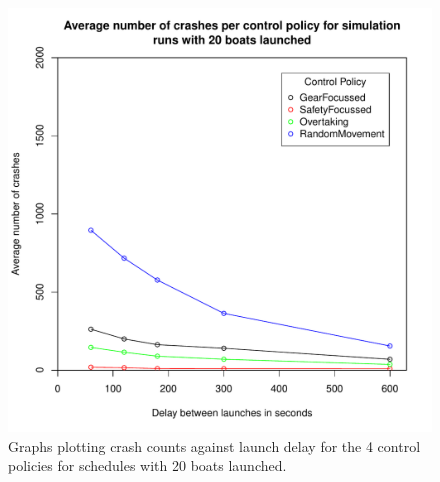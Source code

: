  \begin{figure}
  \begin{center}
    \includegraphics[scale=0.8]{"images/graphs/Average number of crashes per control policy for simulation runs with 20 boats launched"}
    \caption{Graphs plotting crash counts against launch delay for the 4 control policies for schedules with 20 boats launched.}
    \label{experiments:fig:crash_counts_20_launches}
  \end{center}
  \end{figure}
  
